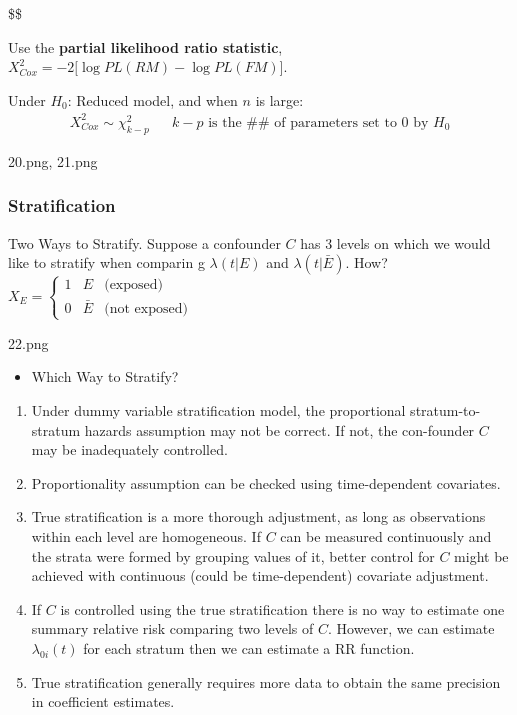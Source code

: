 \documentclass[
]{book}
\providecommand{\tightlist}{%
  \setlength{\itemsep}{0pt}\setlength{\parskip}{0pt}}
\begin{document}
{{{\$\$

Use the \textbf{partial likelihood ratio statistic}, \(X^2_{Cox} = -2 \Big[ \log PL(RM) - \log PL(FM)\Big]\).

Under \(H_0\): Reduced model, and when \(n\) is large:
\[
\begin{align}
X^2_{Cox} \sim \chi^2_{k-p} && k-p \text{ is the ## of parameters set to 0 by }H_0
\end{align}
\]

20.png, 21.png

\hypertarget{stratification}{%
\subsubsection{Stratification}\label{stratification}}

Two Ways to Stratify. Suppose a confounder \(C\) has 3 levels on which we would like to stratify when comparin
g \(\lambda(t \Big | E )\) and \(\lambda ( t \Big | \bar E )\). How? \(X_E = \begin{cases}1&E&\text{(exposed)}\\0&\bar E&\text{(not exposed)}\end{cases}\)

22.png

\begin{itemize}
\tightlist
\item
  Which Way to Stratify?
\end{itemize}

\begin{enumerate}
\def\labelenumi{\arabic{enumi}.}
\tightlist
\item
  Under dummy variable stratification model, the proportional stratum-to-stratum hazards assumption may not be correct. If not, the con-founder \(C\) may be inadequately controlled.
\item
  Proportionality assumption can be checked using time-dependent covariates.
\item
  True stratification is a more thorough adjustment, as long as observations within each level are homogeneous. If \(C\) can be measured continuously and the strata were formed by grouping values of it, better control for \(C\) might be achieved with continuous (could be time-dependent) covariate adjustment.
\item
  If \(C\) is controlled using the true stratification there is no way to estimate one summary relative risk comparing two levels of \(C\). However, we can estimate \(\lambda_{0i}(t)\) for each stratum then we can estimate a RR function.
\item
  True stratification generally requires more data to obtain the same precision in coefficient estimates.
\end{enumerate}

}}}
\end{document}
